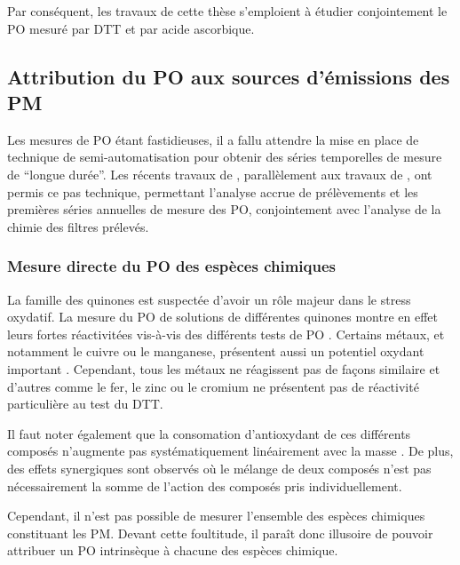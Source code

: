Par conséquent, les travaux de cette thèse s'emploient à étudier conjointement le PO
mesuré par DTT et par acide ascorbique.


\subsection{Attribution du PO aux sources d'émissions des PM}%
\label{sub:attribution_du_po_aux_sources_d_émissions_des_pm}

Les mesures de PO étant fastidieuses, il a fallu attendre la mise en place de technique
de semi-automatisation pour obtenir des séries temporelles de mesure de ``longue durée''. Les récents
travaux de \cite{fangSemiautomated2015}, parallèlement aux travaux de
\cite{calasPollution2017}, ont permis ce pas technique, permettant l'analyse accrue de
prélèvements et les premières séries annuelles de mesure des PO, conjointement avec
l'analyse de la chimie des filtres prélevés.

\subsubsection{Mesure directe du PO des espèces chimiques}%
\label{ssub:mesure_directe_du_po}

La famille des quinones est suspectée d'avoir un rôle majeur dans le stress oxydatif.
La mesure du PO de solutions de différentes quinones montre en effet leurs fortes
réactivitées vis-à-vis des différents tests de PO
\parencite{ayresEvaluating2008,charrierDithiothreitol2012,jiangOxidative2016,calasImportance2017,wangRelationship2018}.
Certains métaux, et notamment le cuivre ou le manganese, présentent aussi un potentiel
oxydant important \parencite{charrierDithiothreitol2012,charrierBias2016}.
Cependant, tous les métaux ne réagissent pas de façons similaire et d'autres comme le fer,
le zinc ou le cromium ne présentent pas de réactivité particulière au test du DTT.

Il faut noter également que la consomation d'antioxydant de ces différents composés
n'augmente pas systématiquement linéairement avec la masse
\parencite{ayresEvaluating2008,charrierDithiothreitol2012,calasImportance2017}.
De plus, des effets synergiques sont observés 
\parencite{charrierDithiothreitol2012,charrierHydrogen2014,xiongRethinking2017,samakeUnexpected2017}
où le mélange de deux composés n'est pas nécessairement la somme de l'action des composés
pris individuellement.

Cependant, il n'est pas possible de mesurer l'ensemble des espèces chimiques constituant
les PM. Devant cette foultitude, il paraît donc illusoire de pouvoir attribuer un PO
intrinsèque à chacune des espèces chimique.

